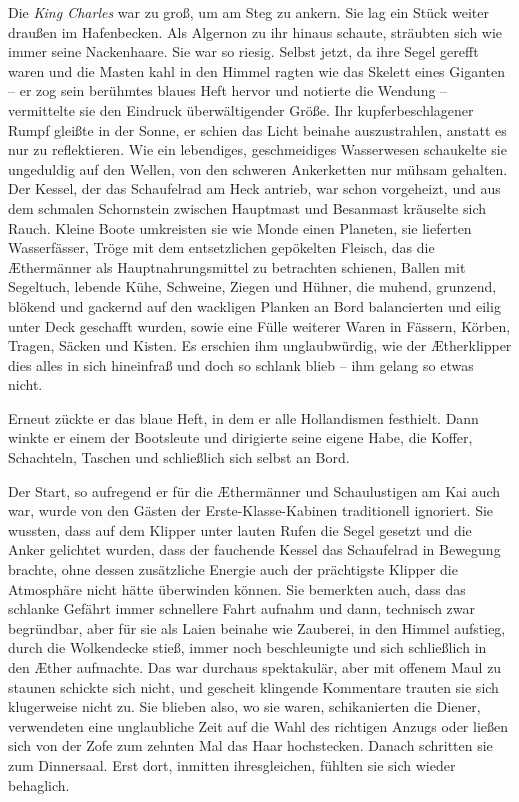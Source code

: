 Die \textit{King Charles} war zu groß, um am Steg zu ankern. Sie lag ein
Stück weiter draußen im Hafenbecken. Als Algernon zu ihr hinaus
schaute, sträubten sich wie immer seine Nackenhaare. Sie war so
riesig. Selbst jetzt, da ihre Segel gerefft waren und die Masten
kahl in den Himmel ragten wie das Skelett eines Giganten – er zog
sein berühmtes blaues Heft hervor und notierte die Wendung –
vermittelte sie den Eindruck überwältigender Größe. Ihr
kupferbeschlagener Rumpf gleißte in der Sonne, er schien das Licht
beinahe auszustrahlen, anstatt es nur zu reflektieren. Wie ein
lebendiges, geschmeidiges Wasserwesen schaukelte sie ungeduldig auf
den Wellen, von den schweren Ankerketten nur mühsam gehalten. Der
Kessel, der das Schaufelrad am Heck antrieb, war schon vorgeheizt,
und aus dem schmalen Schornstein zwischen Hauptmast und Besanmast
kräuselte sich Rauch. Kleine Boote umkreisten sie wie Monde einen
Planeten, sie lieferten Wasserfässer, Tröge mit dem entsetzlichen
gepökelten Fleisch, das die Æthermänner als Hauptnahrungsmittel zu
betrachten schienen, Ballen mit Segeltuch, lebende Kühe, Schweine,
Ziegen und Hühner, die muhend, grunzend, blökend und gackernd auf
den wackligen Planken an Bord balancierten und eilig unter Deck
geschafft wurden, sowie eine Fülle weiterer Waren in Fässern,
Körben, Tragen, Säcken und Kisten. Es erschien ihm unglaubwürdig,
wie der Ætherklipper dies alles in sich hineinfraß und doch so
schlank blieb – ihm gelang so etwas nicht.

Erneut zückte er das blaue Heft, in dem er alle Hollandismen
festhielt. Dann winkte er einem der Bootsleute und dirigierte seine
eigene Habe, die Koffer, Schachteln, Taschen und schließlich sich
selbst an Bord.

\bigpar

Der Start, so aufregend er für die Æthermänner und Schaulustigen am
Kai auch war, wurde von den Gästen der Erste-Klasse-Kabinen
traditionell ignoriert. Sie wussten, dass auf dem Klipper unter
lauten Rufen die Segel gesetzt und die Anker gelichtet wurden, dass
der fauchende Kessel das Schaufelrad in Bewegung brachte, ohne
dessen zusätzliche Energie auch der prächtigste Klipper die
Atmosphäre nicht hätte überwinden können. Sie bemerkten auch, dass
das schlanke Gefährt immer schnellere Fahrt aufnahm und dann,
technisch zwar begründbar, aber für sie als Laien beinahe wie
Zauberei, in den Himmel aufstieg, durch die Wolkendecke stieß,
immer noch beschleunigte und sich schließlich in den Æther
aufmachte. Das war durchaus spektakulär, aber mit offenem Maul zu
staunen schickte sich nicht, und gescheit klingende Kommentare
trauten sie sich klugerweise nicht zu. Sie blieben also, wo sie
waren, schikanierten die Diener, verwendeten eine unglaubliche Zeit
auf die Wahl des richtigen Anzugs oder ließen sich von der Zofe zum
zehnten Mal das Haar hochstecken. Danach schritten sie zum
Dinnersaal. Erst dort, inmitten ihresgleichen, fühlten sie sich
wieder behaglich.

